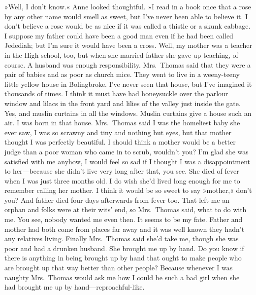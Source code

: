 »Well, I don't know.« Anne looked thoughtful. »I read in a book once that a rose by any other name would smell as sweet, but I've never been able to believe it. I don't believe a rose would be as nice if it was called a thistle or a skunk cabbage. I suppose my father could have been a good man even if he had been called Jedediah; but I'm sure it would have been a cross. Well, my mother was a teacher in the High school, too, but when she married father she gave up teaching, of course. A husband was enough responsibility. Mrs.~Thomas said that they were a pair of babies and as poor as church mice. They went to live in a weeny-teeny little yellow house in Bolingbroke. I've never seen that house, but I've imagined it thousands of times. I think it must have had honeysuckle over the parlour window and lilacs in the front yard and lilies of the valley just inside the gate. Yes, and muslin curtains in all the windows. Muslin curtains give a house such an air. I was born in that house. Mrs.~Thomas said I was the homeliest baby she ever saw, I was so scrawny and tiny and nothing but eyes, but that mother thought I was perfectly beautiful. I should think a mother would be a better judge than a poor woman who came in to scrub, wouldn't you? I'm glad she was satisfied with me anyhow, I would feel so sad if I thought I was a disappointment to her—because she didn't live very long after that, you see. She died of fever when I was just three months old. I do wish she'd lived long enough for me to remember calling her mother. I think it would be so sweet to say »mother,« don't you? And father died four days afterwards from fever too. That left me an orphan and folks were at their wits' end, so Mrs.~Thomas said, what to do with me. You see, nobody wanted me even then. It seems to be my fate. Father and mother had both come from places far away and it was well known they hadn't any relatives living. Finally Mrs.~Thomas said she'd take me, though she was poor and had a drunken husband. She brought me up by hand. Do you know if there is anything in being brought up by hand that ought to make people who are brought up that way better than other people? Because whenever I was naughty Mrs.~Thomas would ask me how I could be such a bad girl when she had brought me up by hand—reproachful-like.

